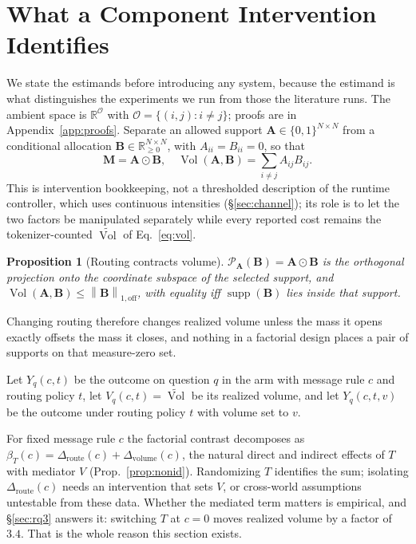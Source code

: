 \documentclass[11pt]{article}
\newcommand{\Vol}{\operatorname{Vol}}
\newcommand{\Volt}{\widetilde{\Vol}}
\newcommand{\onenormoff}[1]{\left\lVert #1 \right\rVert_{1,\mathrm{off}}}
\newtheorem{proposition}{Proposition}
\begin{document}
\section{What a Component Intervention Identifies}
\label{sec:identification}

We state the estimands before introducing any system, because the estimand is
what distinguishes the experiments we run from those the literature runs. The
ambient space is $\mathbb{R}^{\mathcal{O}}$ with
$\mathcal{O}=\{(i,j):i\neq j\}$; proofs are in Appendix~\ref{app:proofs}.
Separate an allowed support
$\mathbf{A}\in\{0,1\}^{N\times N}$ from a conditional allocation
$\mathbf{B}\in\mathbb{R}_{\ge0}^{N\times N}$, with $A_{ii}=B_{ii}=0$, so that
\begin{equation}
\mathbf{M}=\mathbf{A}\odot\mathbf{B},\quad
\Vol(\mathbf{A},\mathbf{B})=\sum_{i\neq j}A_{ij}B_{ij}.
\label{eq:B}
\end{equation}
This is intervention bookkeeping, not a thresholded description of the runtime
controller, which uses continuous intensities (\S\ref{sec:channel}); its role is
to let the two factors be manipulated separately while every reported cost
remains the tokenizer-counted $\Volt$ of Eq.~\ref{eq:vol}.

\begin{proposition}[Routing contracts volume]
\label{prop:proj}
$\mathcal{P}_{\mathbf A}(\mathbf B)=\mathbf A\odot\mathbf B$ is the orthogonal
projection onto the coordinate subspace of the selected support, and
$\Vol(\mathbf{A},\mathbf{B})\le\onenormoff{\mathbf{B}}$, with equality iff
$\operatorname{supp}(\mathbf B)$ lies inside that support.
\end{proposition}

\noindent Changing routing therefore changes realized volume unless the mass
it opens exactly offsets the mass it closes, and nothing in a factorial design
places a pair of supports on that measure-zero set.

Let $Y_q(c,t)$ be the outcome on question $q$ in the arm with message rule $c$
and routing policy $t$, let $V_q(c,t)=\Volt$ be its realized volume, and let
$Y_q(c,t,v)$ be the outcome under routing policy $t$ with volume set to $v$.


For fixed message rule $c$ the factorial contrast decomposes as
$\beta_T(c)=\Delta_{\mathrm{route}}(c)+\Delta_{\mathrm{volume}}(c)$, the natural
direct and indirect effects of $T$ with mediator $V$
(Prop.~\ref{prop:nonid}). Randomizing $T$ identifies the sum; isolating
$\Delta_{\mathrm{route}}(c)$ needs an intervention that sets $V$, or cross-world
assumptions untestable from these data. Whether the mediated term matters is
empirical, and \S\ref{sec:rq3} answers it: switching $T$ at $c=0$ moves realized
volume by a factor of $3.4$. That is the whole reason this section exists.
\end{document}
